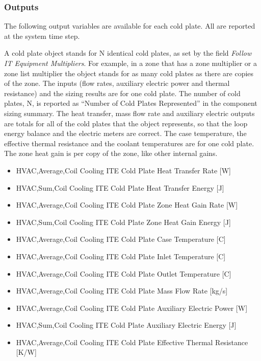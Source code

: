 \subsubsection{Outputs}\label{outputs-coilcoolingitecoldplate}

The following output variables are available for each cold plate. All are reported at the system time step.

A cold plate object stands for N identical cold plates, as set by the field \emph{Follow IT Equipment Multipliers}. For example, in a zone that has a zone multiplier or a zone list multiplier the object stands for as many cold plates as there are copies of the zone. The inputs (flow rates, auxiliary electric power and thermal resistance) and the sizing results are for one cold plate. The number of cold plates, N, is reported as ``Number of Cold Plates Represented'' in the component sizing summary. The heat transfer, mass flow rate and auxiliary electric outputs are totals for all of the cold plates that the object represents, so that the loop energy balance and the electric meters are correct. The case temperature, the effective thermal resistance and the coolant temperatures are for one cold plate. The zone heat gain is per copy of the zone, like other internal gains.

\begin{itemize}
\item
  HVAC,Average,Coil Cooling ITE Cold Plate Heat Transfer Rate {[}W{]}
\item
  HVAC,Sum,Coil Cooling ITE Cold Plate Heat Transfer Energy {[}J{]}
\item
  HVAC,Average,Coil Cooling ITE Cold Plate Zone Heat Gain Rate {[}W{]}
\item
  HVAC,Sum,Coil Cooling ITE Cold Plate Zone Heat Gain Energy {[}J{]}
\item
  HVAC,Average,Coil Cooling ITE Cold Plate Case Temperature {[}C{]}
\item
  HVAC,Average,Coil Cooling ITE Cold Plate Inlet Temperature {[}C{]}
\item
  HVAC,Average,Coil Cooling ITE Cold Plate Outlet Temperature {[}C{]}
\item
  HVAC,Average,Coil Cooling ITE Cold Plate Mass Flow Rate {[}kg/s{]}
\item
  HVAC,Average,Coil Cooling ITE Cold Plate Auxiliary Electric Power {[}W{]}
\item
  HVAC,Sum,Coil Cooling ITE Cold Plate Auxiliary Electric Energy {[}J{]}
\item
  HVAC,Average,Coil Cooling ITE Cold Plate Effective Thermal Resistance {[}K/W{]}
\end{itemize}

